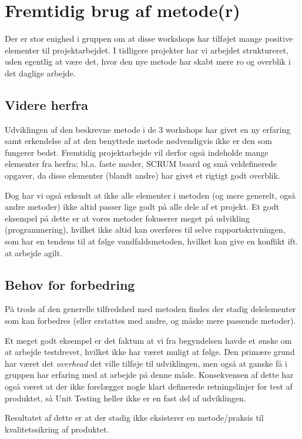 \section{Fremtidig brug af metode(r)}\label{workshop3:fremtidig_brug}
Der er stor enighed i gruppen om at disse workshops har tilføjet mange positive elementer til projektarbejdet.
I tidligere projekter har vi arbejdet struktureret, uden egentlig at være det, hvor den nye metode har skabt mere ro og overblik i det daglige arbejde.

\subsection{Videre herfra}
Udviklingen af den beskrevne metode i de 3 workshops har givet en ny erfaring samt erkendelse af at den benyttede metode nødvendigvis ikke er den som fungerer bedst.
Fremtidig projektarbejde vil derfor også indeholde mange elementer fra herfra; bl.a. faste møder, SCRUM board og små veldefinerede opgaver, da disse elementer (blandt andre) har givet et rigtigt godt overblik.

Dog har vi også erkendt at ikke alle elementer i metoden (og mere generelt, også andre metoder) ikke altid passer lige godt på alle dele af et projekt.
Et godt eksempel på dette er at vores metoder fokuserer meget på udvikling (programmering), hvilket ikke altid kan overføres til selve rapportskrivningen, som har en tendens til at følge vandfaldsmetoden, hvilket kan give en konflikt ift. at arbejde agilt.

\subsection{Behov for forbedring}
På trods af den generelle tilfredshed med metoden findes der stadig delelementer som kan forbedres (eller erstattes med andre, og måske mere passende metoder).

Et meget godt eksempel er det faktum at vi fra begyndelsen havde et ønske om at arbejde testdrevet, hvilket ikke har været muligt at følge.
Den primære grund har været det \textit{overhead} det ville tilføje til udviklingen, men også at ganske få i gruppen har erfaring med at arbejde på denne måde.
Konsekvensen af dette har også været at der ikke forelægger nogle klart definerede retningslinjer for test af produktet, så Unit Testing heller ikke er en fast del af udviklingen.

Resultatet af dette er at der stadig ikke eksisterer en metode/praksis til kvalitetssikring af produktet.
